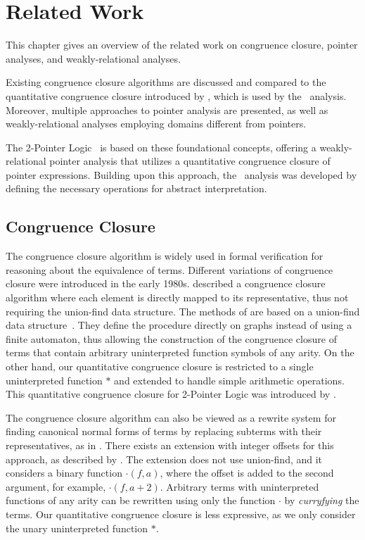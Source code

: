 \chapter{Related Work}\label{chapter:related-work}

This chapter gives an overview of the related work on congruence closure, pointer analyses, and weakly-relational analyses.

Existing congruence closure algorithms are discussed and compared to the quantitative congruence closure introduced by \textcite{2pointer},
which is used by the \cpo\ analysis.
Moreover, multiple approaches to pointer analysis are presented, as well as weakly-relational analyses employing domains different from pointers.

The 2-Pointer Logic~\cite{2pointer} is based on these foundational concepts, offering a weakly-relational pointer analysis that utilizes a quantitative congruence closure of pointer expressions.
Building upon this approach, the \cpo\ analysis was developed by defining the necessary operations for abstract interpretation.

\section{Congruence Closure}

The congruence closure algorithm is widely used in formal verification for reasoning about the equivalence of terms.
Different variations of congruence closure were introduced in the early 1980s.
\textcite{cc-tarjan} described a congruence closure algorithm
where each element is directly mapped to its representative, thus not requiring the union-find data structure.
The methods of \textcite{cc-nelson,cc-shostak} are based on a union-find data structure~\cite{uf-tarjan}.
They define the procedure directly on graphs instead of using a finite automaton, thus allowing the construction of the congruence closure of terms that contain arbitrary uninterpreted function symbols of any arity.
On the other hand, our quantitative congruence closure is restricted to a single uninterpreted function $*$ and extended to handle simple arithmetic operations.
This quantitative congruence closure for 2-Pointer Logic was introduced by \textcite{2pointer}.

The congruence closure algorithm can also be viewed as a rewrite system for finding canonical normal forms of terms by replacing subterms with their representatives, as in \cite{cc-kapur,abstract-cc}.
There exists an extension with integer offsets for this approach, as described by \textcite{cc-offsets}.
The extension does not use union-find, and it considers a binary function $\cdot(f, a)$, where the offset is added to the second argument, for example, $\cdot(f, a + 2)$.
Arbitrary terms with uninterpreted functions of any arity can be rewritten using only the function $\cdot$ by \emph{curryfying} the terms.
Our quantitative congruence closure is less expressive, as we only consider the unary uninterpreted function $*$.

